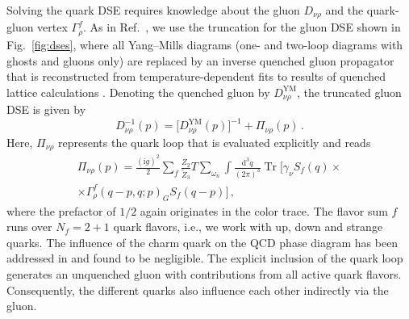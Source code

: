 \documentclass[%
    aps,
    prd,
    reprint,
    superscriptaddress,
    floatfix,
    nofootinbib,
    noamsmath,
    noamssymb
]{revtex4-2}
\DeclareMathOperator{\Tr}{Tr}
\newcommand*{\+}{\hspace*{.08335em}}
\newcommand*{\?}{\hspace*{-.08335em}}
\newcommand*{\dd}{\mathrm{d}}
\newcommand*{\ii}{\mathrm{i}}
\newcommand*{\gs}{g}
\begin{document}
Solving the quark DSE requires knowledge about the gluon $D_{\nu\rho}$ and
the quark-gluon vertex $\Gamma_{\rho}^{f}$. As in Ref.~\cite{Gunkel:2021oya},
we use the truncation for the gluon DSE shown in Fig.~\ref{fig:dses}, where all
Yang--Mills diagrams (one- and two-loop diagrams with ghosts and gluons only)
are replaced by an inverse quenched gluon propagator that is reconstructed
from temperature-dependent fits to results of quenched lattice calculations
\cite{Fischer:2010fx,Maas:2011ez,Eichmann:2015kfa}. Denoting the quenched gluon
by $D_{\nu\rho}^{\textrm{YM}}$, the truncated gluon DSE is given by
\begin{equation}
    \label{eq:gluon_dse}
    D_{\nu\rho}^{-1}(p)
    =
    \bigl[
        D_{\nu\rho}^{\textrm{YM}}(p)
    \bigr]^{-1}
    +
    \Pi_{\nu\rho}(p)
    \,.
\end{equation}
Here, $\Pi_{\nu\rho}$ represents the quark loop that is evaluated explicitly
and reads
\begin{multline}
    \label{eq:quark_loop}
    \Pi_{\nu\rho}(p)
    =
    \frac{(\ii \gs)^{2}}{2}
    \sum_{f}
    \frac{Z_{2}}{\tilde{Z}_{3}}
    T
    \sum_{\omega_{n}}
    \int \frac{\dd^{3} q}{(2 \pi)^{3}}
    \Tr\bigl[
        \gamma_{\nu}
        S_{f}(q)
        \times
        \\
        \times
        \Gamma_{\rho}^{f}(q-p, q; p)_{G}
        S_{f}(q - p)
    \bigr]
    \,,
\end{multline}
where the prefactor of $1/2$ again originates in the color trace. The flavor sum
$f$ runs over $N_f=2+1$ quark flavors, i.e., we work with up, down and strange
quarks. The influence of the charm quark on the QCD phase diagram has been
addressed in \cite{Fischer:2014ata} and found to be negligible. The explicit
inclusion of the quark loop generates an unquenched gluon with contributions
from all active quark flavors. Consequently, the different quarks also influence
each other indirectly via the gluon.
\end{document}
